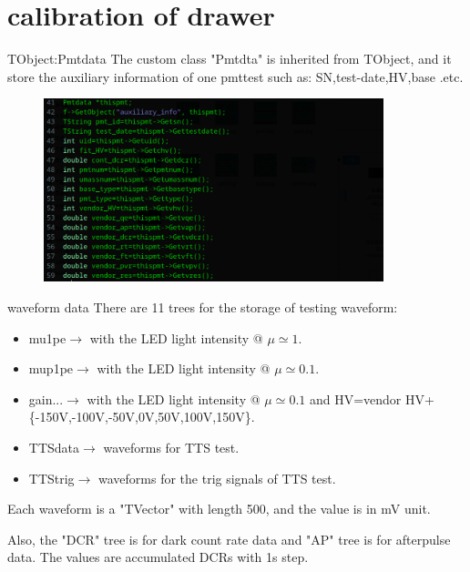 \documentclass[11pt,compress,xcolor=x11names,UTF8]{beamer}
\begin{document}
\section{calibration of drawer}
\begin{frame}{TObject:Pmtdata}
The custom class "Pmtdta" is inherited from TObject, and it store the auxiliary information of one pmttest such as: SN,test-date,HV,base .etc.
\begin{figure}
\centering
\includegraphics[width=0.88\textwidth]{pmtdataclass} %
\end{figure}
\end{frame}
\begin{frame}{waveform data}
There are 11 trees for the storage of testing waveform:
	\begin{itemize}
\item mu1pe$\rightarrow$ with the LED light intensity @ $\mu \simeq 1$.
\item mup1pe$\rightarrow$   with the LED light intensity @ $\mu \simeq 0.1$.
\item gain...$\rightarrow$ with the LED light intensity @ $\mu \simeq 0.1$ and HV=vendor HV+\{-150V,-100V,-50V,0V,50V,100V,150V\}. 
\item TTSdata$\rightarrow$ waveforms for TTS test.
\item TTStrig$\rightarrow$ waveforms for the trig signals of TTS test.
	\end{itemize}
Each waveform is a "TVector" with length 500, and the value is in mV unit.

	\vspace{.5cm}
Also, the "DCR" tree is for dark count rate data and "AP" tree is for afterpulse data. The values are accumulated DCRs with 1s step. 
\end{frame}
\end{document}
